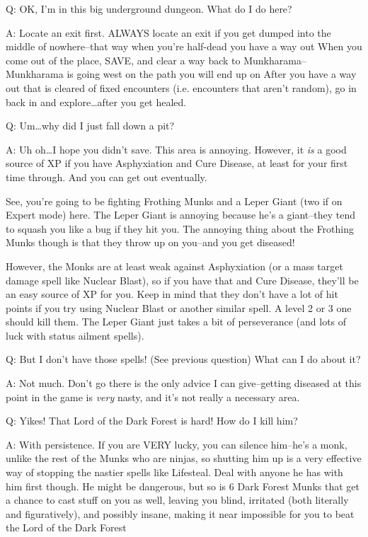 \documentclass[12pt]{article}
\begin{document}
Q: OK, I'm in this big underground dungeon. What do I do here?

A: Locate an exit first. ALWAYS locate an exit if you get dumped into
the middle of nowhere--that way when you're half-dead you have a way out
When you come out of the place, SAVE, and clear a way back to
Munkharama--Munkharama is going west on the path you will end up on
After you have a way out that is cleared of fixed encounters (i.e.
encounters that aren't random), go in back in and explore\ldots{}after
you get healed.

Q: Um\ldots{}why did I just fall down a pit?

A: Uh oh\ldots{}I hope you didn't save. This area is annoying. However,
it \emph{is} a good source of XP if you have Asphyxiation and Cure
Disease, at least for your first time through. And you can get out
eventually.

See, you're going to be fighting Frothing Munks and a Leper Giant (two
if on Expert mode) here. The Leper Giant is annoying because he's a
giant--they tend to squash you like a bug if they hit you. The annoying
thing about the Frothing Munks though is that they throw up on you--and
you get diseased!

However, the Monks are at least weak against Asphyxiation (or a mass
target damage spell like Nuclear Blast), so if you have that and Cure
Disease, they'll be an easy source of XP for you. Keep in mind that they
don't have a lot of hit points if you try using Nuclear Blast or another
similar spell. A level 2 or 3 one should kill them. The Leper Giant just
takes a bit of perseverance (and lots of luck with status ailment
spells).

Q: But I don't have those spells! (See previous question) What can I do
about it?

A: Not much. Don't go there is the only advice I can give--getting
diseased at this point in the game is \emph{very} nasty, and it's not
really a necessary area.

Q: Yikes! That Lord of the Dark Forest is hard! How do I kill him?

A: With persistence. If you are VERY lucky, you can silence him--he's a
monk, unlike the rest of the Munks who are ninjas, so shutting him up is
a very effective way of stopping the nastier spells like Lifesteal. Deal
with anyone he has with him first though. He might be dangerous, but so
is 6 Dark Forest Munks that get a chance to cast stuff on you as well,
leaving you blind, irritated (both literally and figuratively), and
possibly insane, making it near impossible for you to beat the Lord of
the Dark Forest
\end{document}
